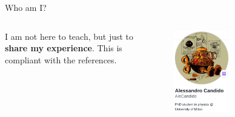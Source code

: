 \documentclass[9pt]{beamer}
\begin{document}
\begin{frame}{Who am I?}
\begin{columns}
\begin{column}{0.47\textwidth}
            I am not here to teach, but just to \textbf{share my experience}.
            This is compliant with the references.
        \end{column}
        \begin{column}{0.5\textwidth}
            \begin{figure}
                \centering
                \includegraphics[width=0.5\textwidth]{mygh}
            \end{figure}
        \end{column}
    \end{columns}
\end{frame}


            
\end{document}
